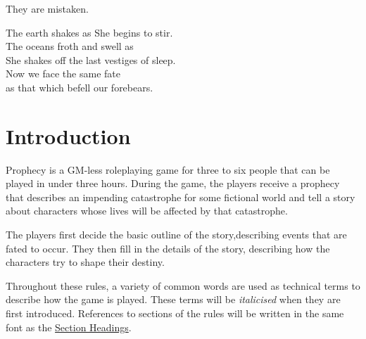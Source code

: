 \documentclass[12pt, a5paper, parskip=half-, footheight=1.4cm]{scrartcl}
\begin{document}
\medskip

They are mistaken. 

\medskip

The earth shakes as She begins to stir.\\
The oceans froth and swell as\\She shakes off the last vestiges of sleep.\\
Now we face the same fate\\as that which befell our forebears.
\vfill

\newpage


\raggedright
\section*{Introduction} \label{section:introduction}
Prophecy is a GM-less roleplaying game for three to six people that can be played in under three hours.
During the game, the players receive a prophecy that describes an impending catastrophe for some fictional world and tell a story about characters whose lives will be affected by that catastrophe. 

The players first decide the basic outline of the story,describing events that are fated to occur.  They then fill in the details of the story, describing how the characters try to shape their destiny.

Throughout these rules, a variety of common words are used as technical terms to describe how the game is played.
These terms will be \emph{italicised} when they are first introduced.
References to sections of the rules will be written in the same font as the \hyperref[section:introduction]{\cinzel \small Section Headings}.
\end{document}
